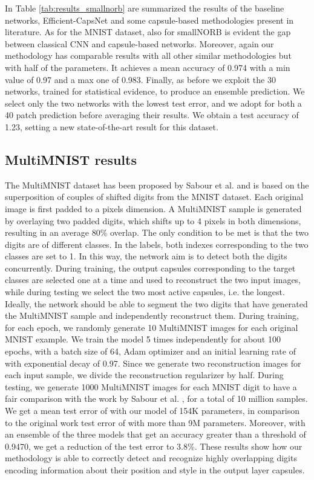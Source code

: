 \documentclass{article}
\begin{document}
In Table \ref{tab:results_smallnorb} are summarized the results of the baseline networks, Efficient-CapsNet and some capsule-based methodologies present in literature. As for the MNIST dataset, also for smallNORB is evident the gap between classical CNN and capsule-based networks. Moreover, again our methodology has comparable results with all other similar methodologies but with half of the parameters. It achieves a mean accuracy of 0.974 with a min value of 0.97 and a max one of 0.983. Finally, as before we exploit the 30 networks, trained for statistical evidence, to produce an ensemble prediction. We select only the two networks with the lowest test error, and we adopt for both a 40 patch prediction\cite{hinton2018matrix} before averaging their results. We obtain a test accuracy of 1.23, setting a new state-of-the-art result for this dataset.


\subsection{MultiMNIST results}
The MultiMNIST dataset has been proposed by Sabour et al. \cite{sabour2017dynamic} and is based on the superposition of couples of shifted digits from the MNIST dataset. Each original image is first padded to a  pixels dimension. A MultiMNIST sample is generated by overlaying two padded digits, which shifts up to 4 pixels in both dimensions, resulting in an average 80\% overlap. The only condition to be met is that the two digits are of different classes. In the labels, both indexes corresponding to the two classes are set to 1. In this way, the network aim is to detect both the digits concurrently. During training, the output capsules corresponding to the target classes are selected one at a time and used to reconstruct the two input images, while during testing we select the two most active capsules, i.e. the longest. Ideally, the network should be able to segment the two digits that have generated the MultiMNIST sample and independently reconstruct them. During training, for each epoch, we randomly generate 10 MultiMNIST images for each original MNIST example. We train the model 5 times independently for about 100 epochs, with a batch size of 64, Adam optimizer and an initial learning rate of  with exponential decay of 0.97. Since we generate two reconstruction images for each input sample, we divide the reconstruction regularizer by half. During testing, we generate 1000 MultiMNIST images for each MNIST digit to have a fair comparison with the work by Sabour et al. \cite{sabour2017dynamic}, for a total of 10 million samples. We get a mean test error of  with our model of 154K parameters, in comparison to the original work test error of  with more than 9M parameters. Moreover, with an ensemble of the three models that get an accuracy greater than a threshold of 0.9470, we get a reduction of the test error to 3.8\%. These results show how our methodology is able to correctly detect and recognize highly overlapping digits encoding information about their position and style in the output layer capsules.
\end{document}
